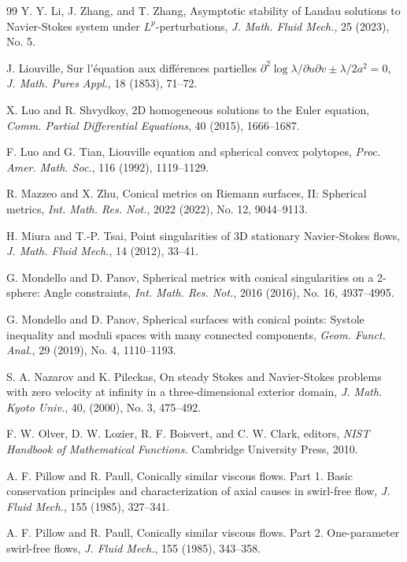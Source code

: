 \documentclass[12pt]{article}
\begin{document}
\begin{thebibliography}{99}
 Y. Y. Li, J. Zhang, and T. Zhang, Asymptotic stability of Landau solutions to Navier-Stokes system under $L^p$-perturbations, \emph{J. Math. Fluid Mech.}, 25 (2023), No. 5. 

 J. Liouville, Sur l'\'{e}quation aux diff\'{e}rences partielles $\partial^2 \log \lambda/\partial u \partial v \pm \lambda/2a^2 = 0$, \emph{J. Math. Pures Appl.}, 18 (1853), 71--72. 

 X. Luo and R. Shvydkoy, 2D homogeneous solutions to the Euler equation, \emph{Comm. Partial Differential Equations}, 40 (2015), 1666--1687.

 F. Luo and G. Tian, Liouville equation and spherical convex polytopes, \emph{Proc. Amer. Math. Soc.}, 116 (1992), 1119--1129.

 R. Mazzeo and X. Zhu, Conical metrics on Riemann surfaces, II: Spherical metrics, \emph{Int. Math. Res. Not.}, 2022 (2022), No. 12, 9044--9113.

 H. Miura and T.-P. Tsai, Point singularities of 3D stationary Navier-Stokes flows, \emph{J. Math. Fluid Mech.}, 14 (2012), 33--41.

 G. Mondello and D. Panov, Spherical metrics with conical singularities on a 2-sphere: Angle constraints, \emph{Int. Math. Res. Not.}, 2016 (2016), No. 16, 4937--4995.

 G. Mondello and D. Panov, Spherical surfaces with conical points: Systole inequality and moduli spaces with many connected components, \emph{Geom. Funct. Anal.}, 29 (2019), No. 4, 1110--1193. 

 S. A. Nazarov and K. Pileckas, On steady Stokes and Navier-Stokes problems with zero velocity at infinity in a three-dimensional exterior domain, \emph{J. Math. Kyoto Univ.}, 40, (2000), No. 3, 475--492.

 F. W. Olver, D. W. Lozier, R. F. Boisvert, and C. W. Clark, editors, \emph{NIST Handbook of Mathematical Functions.} Cambridge University Press, 2010.

 A. F. Pillow and R. Paull, Conically similar viscous flows. Part 1. Basic conservation principles and characterization of axial causes in swirl-free flow, \emph{J. Fluid Mech.}, 155 (1985), 327--341.

 A. F. Pillow and R. Paull, Conically similar viscous flows. Part 2. One-parameter swirl-free flows, \emph{J. Fluid Mech.}, 155 (1985), 343--358.


\end{thebibliography}
\end{document}
